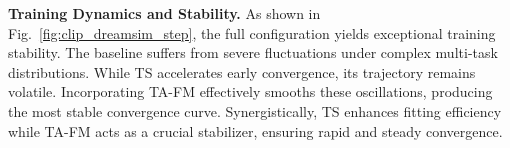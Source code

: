 \noindent
\textbf{Training Dynamics and Stability.}
As shown in Fig.~\ref{fig:clip_dreamsim_step},  the full configuration yields exceptional training stability. The baseline suffers from severe fluctuations under complex multi-task distributions. While TS accelerates early convergence, its trajectory remains volatile. Incorporating TA-FM effectively smooths these oscillations, producing the most stable convergence curve. Synergistically, TS enhances fitting efficiency while TA-FM acts as a crucial stabilizer, ensuring rapid and steady convergence.









